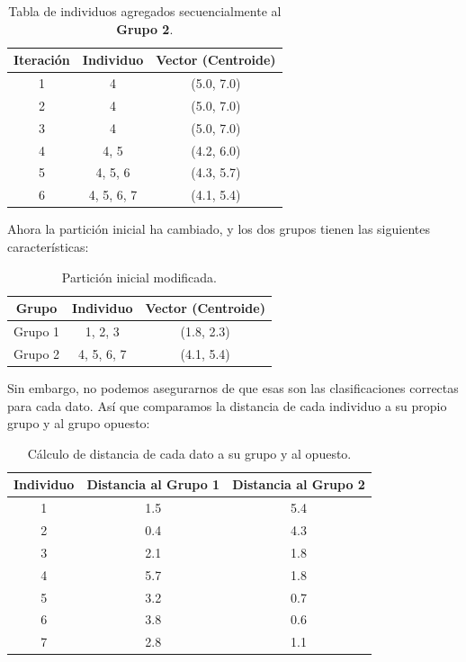 \begin{UClist}
	\begin{table}[H]
		\begin{center}
			\label{tab:gruposIndividuosCompletosGrupo2}
			\begin{tabular}{c|c|c}
				\textbf{Iteración} & \textbf{Individuo} & \textbf{Vector (Centroide)}\\
				\hline
				1 & 4 & (5.0, 7.0)\\
				2 & 4 & (5.0, 7.0)\\
				3 & 4 & (5.0, 7.0)\\
				4 & 4, 5 & (4.2, 6.0)\\
				5 & 4, 5, 6 & (4.3, 5.7)\\
				6 & 4, 5, 6, 7 & (4.1, 5.4)\\
			\end{tabular}
		\end{center}
		\caption{Tabla de individuos agregados secuencialmente al \textbf{Grupo 2}.}
	\end{table}

	\UCli Ahora la partición inicial ha cambiado, y los dos grupos tienen las siguientes características:

	\begin{table}[H]
		\begin{center}
			\label{tab:gruposModificadosKMeans}
			\begin{tabular}{c|c|c}
				\textbf{Grupo} & \textbf{Individuo} & \textbf{Vector (Centroide)}\\
				\hline
				Grupo 1 & 1, 2, 3 & (1.8, 2.3)\\
				Grupo 2 & 4, 5, 6, 7 & (4.1, 5.4)\\
			\end{tabular}
		\end{center}
		\caption{Partición inicial modificada.}
	\end{table}

	\UCli Sin embargo, no podemos asegurarnos de que esas son las clasificaciones correctas para cada dato. Así que comparamos la distancia de cada individuo a su propio grupo y al grupo opuesto:

	\begin{table}[H]
		\begin{center}
			\label{tab:distanciasACadaGrupo}
			\begin{tabular}{c|c|c}
				\textbf{Individuo} & \textbf{Distancia al Grupo 1} & \textbf{Distancia al Grupo 2}\\
				\hline
				1 & 1.5 & 5.4\\
				2 & 0.4 & 4.3\\
				3 & 2.1 & 1.8\\
				4 & 5.7 & 1.8\\
				5 & 3.2 & 0.7\\
				6 & 3.8 & 0.6\\
				7 & 2.8 & 1.1\\
			\end{tabular}
		\end{center}
		\caption{Cálculo de distancia de cada dato a su grupo y al opuesto.}
	\end{table}


\end{UClist}
